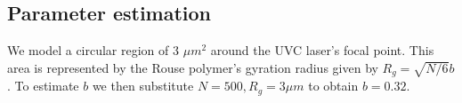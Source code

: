 \documentclass[12pt]{article}
\begin{document}
	\subsection{Parameter estimation}
	We model a circular region of 3 $\mu m^2$ around the UVC laser's focal point. This area is represented by the Rouse polymer's gyration radius given by $R_g= \sqrt{N/6}b$. To estimate $b$ we then substitute $N=500, R_g=3\mu m$ to obtain $b=0.32$. 
	
		
	
\end{document}
